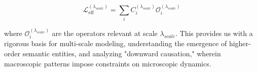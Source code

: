 \begin{equation}
\mathcal{L}_{\mathrm{eff}}^{(\lambda_{scale})} = \sum_{i} C_{i}^{(\lambda_{scale})} \mathcal{O}_{i}^{(\lambda_{scale})}
\end{equation}

where \(\mathcal{O}_{i}^{(\lambda_{scale})}\) are the operators relevant at scale \(\lambda_{scale}\). This provides us with a rigorous basis for multi-scale modeling, understanding the emergence of higher-order semantic entities, and analyzing "downward causation," wherein macroscopic patterns impose constraints on microscopic dynamics.